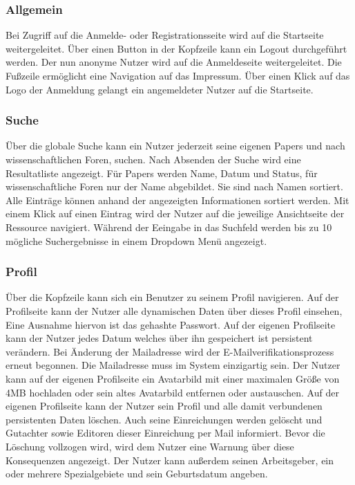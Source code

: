 \subsubsection{Allgemein}
\begin{description}
     Bei Zugriff auf die Anmelde- oder Registrationsseite
    wird auf die Startseite weitergeleitet.
     Über einen Button in der Kopfzeile kann ein Logout durchgeführt werden.
    Der nun anonyme Nutzer wird auf die Anmeldeseite weitergeleitet.
     Die Fußzeile ermöglicht eine Navigation auf das Impressum.
    \XXitem{} Über einen Klick auf das Logo der Anmeldung gelangt ein angemeldeter Nutzer auf die
    Startseite.
\end{description}

\subsubsection{Suche}
\begin{description}
    \XXitem{} Über die globale Suche kann ein Nutzer jederzeit seine eigenen Papers und nach wissenschaftlichen Foren,
    suchen. Nach Absenden der Suche wird eine Resultatliste angezeigt. Für Papers werden Name, Datum und Status, für
    wissenschaftliche Foren nur der Name abgebildet. %
    Sie sind nach Namen sortiert.
    \XXitem{} Alle Einträge können anhand der angezeigten Informationen sortiert werden.
    Mit einem Klick auf einen Eintrag wird der Nutzer auf die jeweilige Ansichtseite
    der Ressource navigiert.
     Während der Eeingabe in das Suchfeld werden bis zu 10 mögliche Suchergebnisse in
    einem Dropdown Menü angezeigt.
\end{description}

\subsubsection{Profil}
\begin{description}
    \XXitem{} Über die Kopfzeile kann sich ein Benutzer zu seinem Profil navigieren.
    \XXitem{} Auf der Profilseite kann der Nutzer alle dynamischen Daten über dieses Profil einsehen,
    Eine Ausnahme hiervon ist das gehashte Passwort. %
     Auf der eigenen Profilseite kann der Nutzer jedes Datum %
    welches über ihn gespeichert ist persistent verändern.
     Bei Änderung der Mailadresse wird der E-Mailverifikationsprozess erneut
    begonnen. Die Mailadresse muss im System einzigartig sein. %
    \XXitem{} Der Nutzer kann auf der eigenen Profilseite ein Avatarbild mit einer maximalen
    Größe von 4MB hochladen oder sein altes Avatarbild entfernen oder austauschen. %
    \XXitem{} Auf der eigenen Profilseite kann der Nutzer sein Profil und alle damit verbundenen persistenten
    Daten löschen. Auch seine Einreichungen werden gelöscht und Gutachter sowie Editoren dieser
    Einreichung per Mail informiert. Bevor die Löschung vollzogen wird, wird dem Nutzer
    eine Warnung über diese Konsequenzen angezeigt.
     Der Nutzer kann außerdem seinen Arbeitsgeber, ein oder mehrere Spezialgebiete
    und sein Geburtsdatum angeben.
\end{description}

